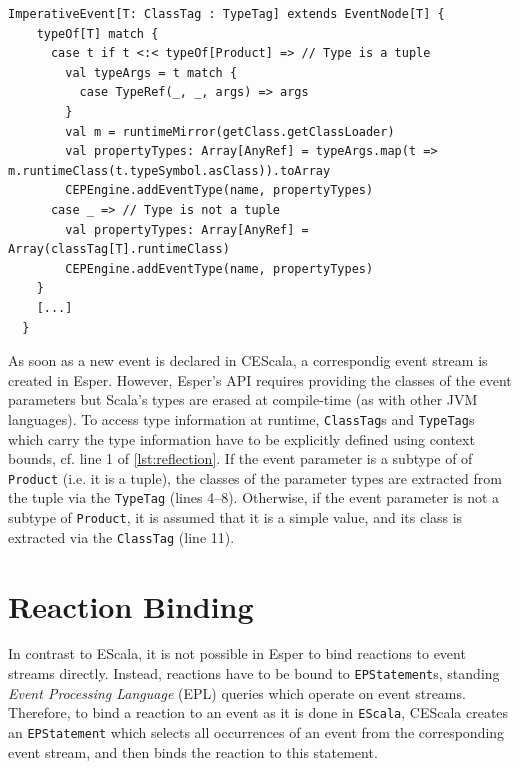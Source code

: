 \documentclass[book,type=bsc,colorback,accentcolor=tud8b,12pt,twoside]{tudthesis}
\begin{document}
\begin{lstlisting}[caption=Using the Scala Reflection API to identify event parameter types,label=lst:reflection,float=tp]
  ImperativeEvent[T: ClassTag : TypeTag] extends EventNode[T] {
    typeOf[T] match {
      case t if t <:< typeOf[Product] => // Type is a tuple
        val typeArgs = t match {
          case TypeRef(_, _, args) => args
        }
        val m = runtimeMirror(getClass.getClassLoader)
        val propertyTypes: Array[AnyRef] = typeArgs.map(t => m.runtimeClass(t.typeSymbol.asClass)).toArray
        CEPEngine.addEventType(name, propertyTypes)
      case _ => // Type is not a tuple
        val propertyTypes: Array[AnyRef] = Array(classTag[T].runtimeClass)
        CEPEngine.addEventType(name, propertyTypes)
    }
    [...]
  }
\end{lstlisting}

As soon as a new event is declared in CEScala, a correspondig event stream is created in Esper.  However, Esper's API requires providing the classes of the event parameters but Scala's types are erased at compile-time (as with other JVM languages).  To access type information at runtime, \mbox{\texttt{ClassTag}}s and \mbox{\texttt{TypeTag}}s which carry the type information have to be explicitly defined using context bounds, cf. line 1 of \autoref{lst:reflection}.  If the event parameter is a subtype of of \mbox{\texttt{Product}} (i.e. it is a tuple), the classes of the parameter types are extracted from the tuple via the \mbox{\texttt{TypeTag}} (lines 4--8).  Otherwise, if the event parameter is not a subtype of \mbox{\texttt{Product}}, it is assumed that it is a simple value, and its class is extracted via the \mbox{\texttt{ClassTag}} (line 11).

\section{Reaction Binding}
\label{sec:reaction-binding}

In contrast to EScala, it is not possible in Esper to bind reactions to event streams directly.  Instead, reactions have to be bound to \mbox{\texttt{EPStatement}}s, standing \emph{Event Processing Language} (EPL) queries which operate on event streams.  Therefore, to bind a reaction to an event as it is done in \mbox{\texttt{EScala}}, CEScala creates an \mbox{\texttt{EPStatement}} which selects all occurrences of an event from the corresponding event stream, and then binds the reaction to this statement.  
\end{document}
